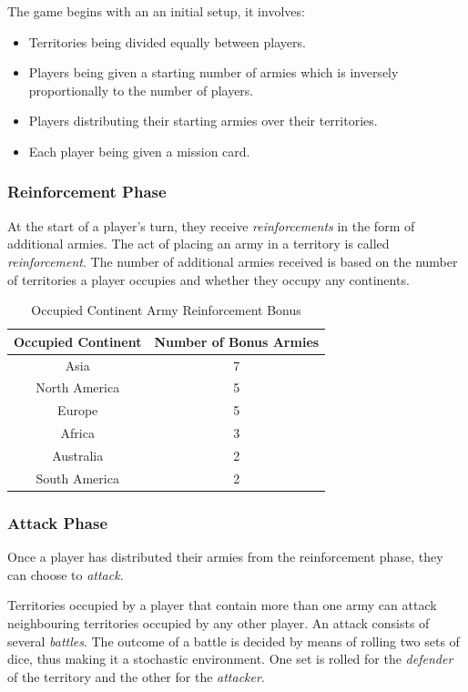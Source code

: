 \documentclass[parskip]{cs4rep}
\begin{document}
The game begins with an an initial setup, it involves:

\begin{itemize}
\item
Territories being divided equally between players.
\item
Players being given a starting number of armies which is inversely proportionally to the number of players.
\item
Players distributing their starting armies over their territories.
\item
Each player being given a mission card.
\end{itemize}

\subsubsection{Reinforcement Phase}

At the start of a player's turn, they receive \textit{reinforcements} in the form of additional armies. The act of placing an army in a territory is called \textit{reinforcement}.  The number of additional armies received is based on the number of territories a player occupies and whether they occupy any continents.
\newline

\begin{table}[ht]
\centering
\begin{tabular}{|c|c|}
\hline 
\textbf{Occupied Continent} & \textbf{Number of Bonus Armies} \\ 
\hline 
Asia & 7 \\ 
\hline 
North America & 5 \\ 
\hline 
Europe & 5 \\ 
\hline 
Africa & 3 \\
\hline
Australia & 2 \\
\hline  
South America & 2 \\
\hline 
\end{tabular}
\caption{Occupied Continent Army Reinforcement Bonus}
\label{table:continent-bonus}
\end{table}

\subsubsection{Attack Phase}

Once a player has distributed their armies from the reinforcement phase, they can choose to \textit{attack}. 

Territories occupied by a player that contain more than one army can attack neighbouring territories occupied by any other player. An attack consists of several \textit{battles}. The outcome of a battle is decided by means of rolling two sets of dice, thus making it a stochastic environment. One set is rolled for the \textit{defender} of the territory and the other for the \textit{attacker}. 
\end{document}

